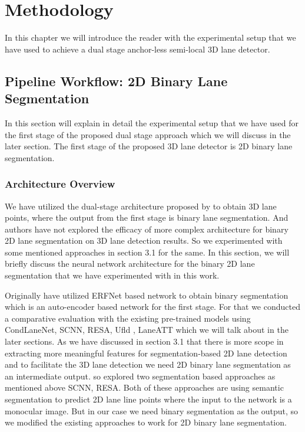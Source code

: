 

    \chapter{Methodology}
    In this chapter we will introduce the reader with the experimental setup that we have used to achieve a dual stage anchor-less semi-local 3D lane detector.  

     \section{Pipeline Workflow: 2D Binary Lane Segmentation}
     In this section will explain in detail the experimental setup that we have used for the first stage of the proposed dual stage approach which we will discuss in the later section. The first stage of the proposed 3D lane detector is 2D binary lane segmentation. 
     
        \subsection{Architecture Overview}
        We have utilized the dual-stage architecture proposed by \cite{guo2020gen} to obtain 3D lane points, where the output from the first stage is binary lane segmentation. And authors have not explored the efficacy of more complex architecture for binary 2D lane segmentation on 3D lane detection results. So we experimented with some mentioned approaches in section 3.1 for the same. In this section, we will briefly discuss the neural network architecture for the binary 2D lane segmentation that we have experimented with in this work. 
        
        Originally \cite{guo2020gen} have utilized ERFNet\cite{Romera2018ERFNetER} based network to obtain binary segmentation which is an auto-encoder based network for the first stage. For that we conducted a comparative evaluation with the existing pre-trained models using CondLaneNet\cite{DBLP:journals/corr/abs-2105-05003}, SCNN\cite{pan2018SCNN}, RESA\cite{DBLP:journals/corr/abs-2008-13719}, Ufld \cite{DBLP:journals/corr/abs-2004-11757}, LaneATT\cite{https://doi.org/10.48550/arxiv.2010.12035} which we will talk about in the later sections. As we have discussed in section 3.1 that there is more scope in extracting more meaningful features for segmentation-based 2D lane detection and to facilitate the 3D lane detection we need 2D binary lane segmentation as an intermediate output. so explored two segmentation based approaches as mentioned above SCNN\cite{pan2018SCNN}, RESA\cite{DBLP:journals/corr/abs-2008-13719}. Both of these approaches are using semantic segmentation to predict 2D lane line points where the input to the network is a monocular image. But in our case we need binary segmentation as the output, so we modified the existing approaches to work for 2D binary lane segmentation.    
        
